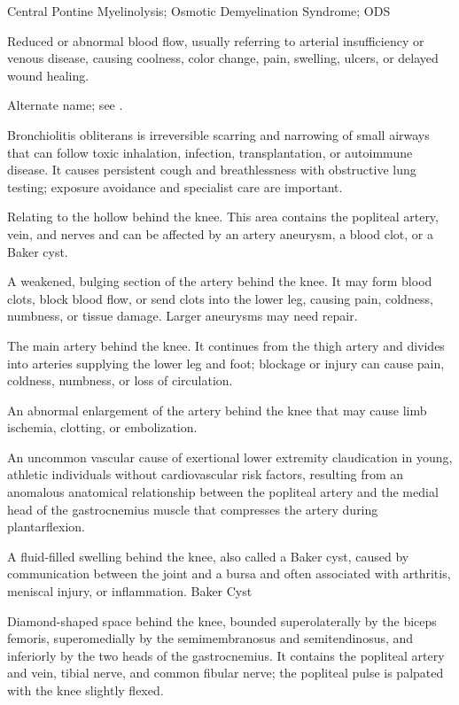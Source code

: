 \synonyms
Central Pontine Myelinolysis; Osmotic Demyelination Syndrome; ODS

 Reduced or abnormal blood flow, usually referring to arterial insufficiency or venous disease, causing coolness, color change, pain, swelling, ulcers, or delayed wound healing.

 Alternate name; see .

 Bronchiolitis obliterans is irreversible scarring and narrowing of small airways that can follow toxic inhalation, infection, transplantation, or autoimmune disease. It causes persistent cough and breathlessness with obstructive lung testing; exposure avoidance and specialist care are important.

 Relating to the hollow behind the knee. This area contains the popliteal artery, vein, and nerves and can be affected by an artery aneurysm, a blood clot, or a Baker cyst.

 A weakened, bulging section of the artery behind the knee. It may form blood clots, block blood flow, or send clots into the lower leg, causing pain, coldness, numbness, or tissue damage. Larger aneurysms may need repair.

 The main artery behind the knee. It continues from the thigh artery and divides into arteries supplying the lower leg and foot; blockage or injury can cause pain, coldness, numbness, or loss of circulation.

 An abnormal enlargement of the artery behind the knee that may cause limb ischemia, clotting, or embolization.

 An uncommon vascular cause of exertional lower extremity claudication in young, athletic individuals without cardiovascular risk factors, resulting from an anomalous anatomical relationship between the popliteal artery and the medial head of the gastrocnemius muscle that compresses the artery during plantarflexion.

 A fluid-filled swelling behind the knee, also called a Baker cyst, caused by communication between the joint and a bursa and often associated with arthritis, meniscal injury, or inflammation.
\synonyms
Baker Cyst

 Diamond-shaped space behind the knee, bounded superolaterally by the biceps femoris,
superomedially by the semimembranosus and semitendinosus, and inferiorly by the two heads of the
gastrocnemius. It contains the popliteal artery and vein, tibial nerve, and common fibular nerve;
the popliteal pulse is palpated with the knee slightly flexed.

